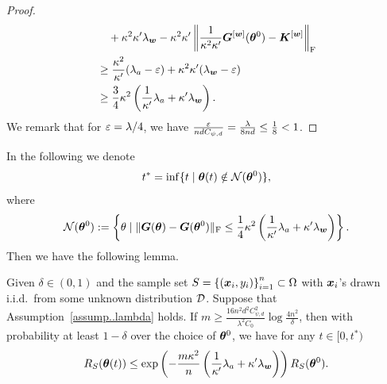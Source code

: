 \documentclass{article}
\begin{document}
\begin{proof}
\begin{equation*}
\begin{aligned}
             & \quad + \kappa^2\kappa'\lambda_{\bm{w}} - \kappa^2\kappa'\left\lVert\frac{1}{\kappa^2\kappa'}\bm{G}^{[\bm{w}]}(\bm{\theta}^0) - \bm{K}^{[\bm{w}]}\right\rVert_\mathrm{F}     \\
             & \geq\frac{\kappa^2}{\kappa'}(\lambda_a-\varepsilon)+\kappa^2\kappa'(\lambda_{\bm{w}}-\varepsilon)                                                          \\
             & \geq\frac{3}{4}\kappa^2\left(\frac{1}{\kappa'}\lambda_a+\kappa'\lambda_{\bm{w}}\right).
        \end{aligned}
    \end{equation*}
    We remark that for $\varepsilon=\lambda/4$, we have $\frac{\varepsilon}{ndC_{\psi,d}}=\frac{\lambda}{8nd}\leq \frac{1}{8}< 1$.
\end{proof}

\noindent In the following we denote
\begin{equation}
    t^* = \inf\{t \mid \bm{\theta}(t)\notin \mathcal{N}(\bm{\theta}^0)\},
\end{equation}
where
\begin{equation}
    \mathcal{N}(\bm{\theta}^0) := \left\{\theta \mid \lVert\bm{G}(\bm{\theta}) - \bm{G}(\bm{\theta}^0)\rVert_\mathrm{F}\leq \frac{1}{4}\kappa^2\left(\frac{1}{\kappa'}\lambda_a+\kappa'\lambda_{\bm{w}}\right)\right\}.
\end{equation}
Then we have the following lemma.
\begin{lem}\label{lem:exp_RS}
    Given $\delta\in(0,1)$ and the sample set $S = {\{(\bm{x}_i, y_i)\}}_{i=1}^n\subset\Omega$ with $\bm{x}_i$'s drawn i.i.d.\ from some unknown distribution $\mathcal{D}$. Suppose that Assumption~\ref{assump..lambda} holds. If $m\geq\frac{16n^2d^2C_{\psi,d}^2}{\lambda^2C_0}\log\frac{4n^2}{\delta}$, then with probability at least $1-\delta$ over the choice of $\bm{\theta}^0$, we have for any $t\in[0, t^*)$
    \begin{equation}
        R_S(\bm{\theta}(t)) \leq \exp\left(-\frac{m\kappa^2}{n}\left(\frac{1}{\kappa'}\lambda_a+\kappa'\lambda_{\bm{w}}\right)\right)R_S(\bm{\theta}^0).
    \end{equation}
\end{lem}
\end{document}

